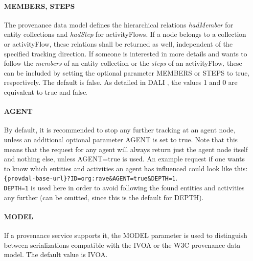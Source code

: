\paragraph{MEMBERS, STEPS}
The provenance data model defines the hierarchical relations \emph{hadMember} for entity collections and \emph{hadStep} for activityFlows. If a node belongs to a collection or activityFlow, these relations shall be returned as well, independent of the specified tracking direction.
If someone is interested in more details and wants to follow the \emph{members} of an entity collection or the \emph{steps} of an activityFlow, these can be included by setting the optional parameter MEMBERS or STEPS to true, respectively. The default is false. As detailed in DALI \citep{std:DALI}, the values 1 and 0 are equivalent to true and false.

\paragraph{AGENT}
By default, it is recommended to stop any further tracking at an agent node, unless an additional optional parameter AGENT is set to true. Note that this means that the request for any agent will always return just the agent node itself and nothing else, unless AGENT=true is used. An example request if one wants to know which entities and activities an agent has influenced could look like this:\\
\texttt{\{provdal-base-url\}?ID=org:rave\&AGENT=true\&DEPTH=1}.\\
\texttt{DEPTH=1} is used here in order to avoid following the found entities and activities any further (can be omitted, since this is the default for DEPTH).


\paragraph{MODEL}
If a provenance service supports it, the MODEL parameter is used to distinguish between serializations compatible with the IVOA or the W3C provenance data model. The default value is IVOA.
\newline



